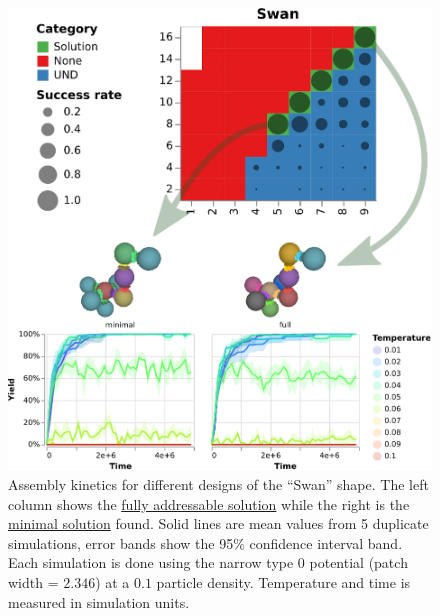 \begin{figure}[ht]
    \centering
    \includegraphics[width=\linewidth]{figures/patchysim/swanKinetics.eps}
    \caption{Assembly kinetics for different designs of the ``Swan'' shape. The left column shows the  \href{https://akodiat.github.io/polycubes/?assemblyMode=stochastic&rule=89010204000099099e00a20c0101861000000115920000009501020000000119020000000101021c0000010102000020010102008e00}{fully addressable solution} while the right is the \href{https://akodiat.github.io/polycubes/?assemblyMode=stochastic&rule=8f0b080b000b0b00000012008791000000000c0005000000000088000000}{minimal solution} found. Solid lines are mean values from 5 duplicate simulations, error bands show the 95\% confidence interval band. Each simulation is done using the narrow type \(0\) potential (patch width = \(2.346\)) at a \(0.1\) particle density. Temperature and time is measured in simulation units.}
    \label{fig:swanKinetics}
\end{figure}

